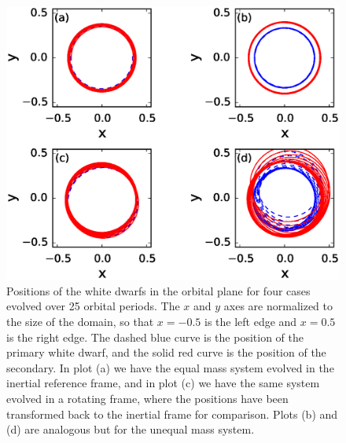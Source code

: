 \documentclass[12pt]{article}
\begin{document}
\begin{figure}[h!]
  \centering
  \includegraphics[scale=0.8,trim=0.1in 0.0in 0.1in 0.0in,clip]{plots/circular_orbit_comparison}
  \caption[White dwarf positions over 25 orbital periods]
          {Positions of the white dwarfs in the orbital plane for four
           cases evolved over 25 orbital periods.  The $x$ and $y$ axes are
           normalized to the size of the domain, so that $x = -0.5$ is the
           left edge and $x = 0.5$ is the right edge. The dashed blue curve
           is the position of the primary white dwarf, and the solid red
           curve is the position of the secondary. In plot (a) we have the
           equal mass system evolved in the inertial reference frame, and in
           plot (c) we have the same system evolved in a rotating frame,
           where the positions have been transformed back to the inertial
           frame for comparison.  Plots (b) and (d) are analogous but for the
           unequal mass system.\label{fig:circular_orbit_comparison}}
\end{figure}
\end{document}
